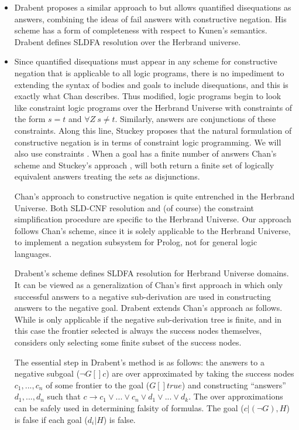 \documentclass{tlp}
\newcommand{\where}{[\!]} %
\begin{document}
\begin{itemize}
\item Drabent \cite{Drabent} proposes a similar approach to
\cite{Malus} but allows quantified disequations as answers, combining
the ideas of fail answers with constructive negation. His scheme has a
form of completeness with respect to Kunen's semantics. Drabent
defines SLDFA resolution over the Herbrand universe.

\item Since quantified disequations must appear in any scheme for
constructive negation that is applicable to all logic programs, there
is no impediment to extending the syntax of bodies and goals to
include disequations, and this is exactly what Chan describes. Thus
modified, logic programs begin to look like constraint logic programs
over the Herbrand Universe with constraints of the form $s=t$ and
$\forall Z~ s \neq t$. Similarly, answers are conjunctions of these
constraints. Along this line, Stuckey \cite{Stuckey95} proposes that
the natural formulation of constructive negation is in terms of
constraint logic programming. We will also use constraints%
. When a goal has a finite
number of answers Chan's scheme \cite{Chan1} and Stuckey's approach
\cite{Stuckey}, will both return a finite set of logically equivalent
answers treating the sets as disjunctions.

Chan's approach to constructive negation is quite entrenched in the
Herbrand Universe. Both SLD-CNF resolution and (of course) the
constraint simplification procedure are specific to the Herbrand
Universe. Our approach follows Chan's scheme, since it is solely
applicable to the Herbrand Universe, to implement a negation subsystem
for Prolog, not for general logic languages.

Drabent's scheme \cite{Drabent} defines SLDFA resolution for Herbrand
Universe domains. It can be viewed as a generalization of Chan's first
approach \cite{Chan1} in which only successful answers to a negative
sub-derivation are used in constructing answers to the negative
goal. Drabent extends Chan's approach as follows. While
\cite{Chan1} is only applicable if the negative sub-derivation tree is
finite, and in this case the frontier selected is always the success
nodes themselves, \cite{Drabent} considers only selecting some finite
subset of the success nodes.

The essential step in Drabent's method is as follows: the answers to a
negative subgoal ($\neg G \where c$) are over approximated by taking
the success nodes $c_1, ..., c_n$ of some frontier to the goal ($G
\where true$) and constructing ``answers'' $d_1, ..., d_n$ such that
$c \rightarrow c_1 \vee ... \vee c_n \vee d_1 \vee ... \vee d_k$. The
over approximations can be safely used in determining falsity of
formulas. The goal ($c | (\neg G), H$) is false if each goal ($d_i |
H$) is false.


\end{itemize}
\end{document}
